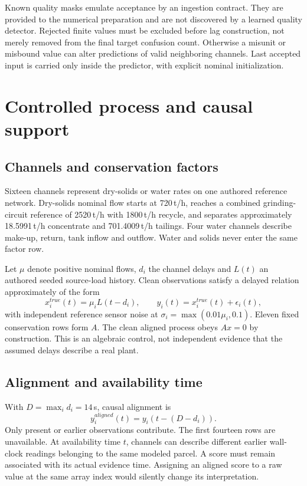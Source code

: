 \documentclass[11pt,a4paper]{article}
\begin{document}
Known quality masks emulate acceptance by an ingestion contract. They are provided to the numerical preparation and are not discovered by a learned quality detector. Rejected finite values must be excluded before lag construction, not merely removed from the final target confusion count. Otherwise a misunit or misbound value can alter predictions of valid neighboring channels. Last accepted input is carried only inside the predictor, with explicit nominal initialization.

\section{Controlled process and causal support}
\subsection{Channels and conservation factors}
Sixteen channels represent dry-solids or water rates on one authored reference network. Dry-solids nominal flow starts at 720\,t/h, reaches a combined grinding-circuit reference of 2520\,t/h with 1800\,t/h recycle, and separates approximately 18.5991\,t/h concentrate and 701.4009\,t/h tailings. Four water channels describe make-up, return, tank inflow and outflow. Water and solids never enter the same factor row.

Let $\mu$ denote positive nominal flows, $d_i$ the channel delays and $L(t)$ an authored seeded source-load history. Clean observations satisfy a delayed relation approximately of the form
\begin{equation}
 x_i^{true}(t)=\mu_i L(t-d_i),\qquad
 y_i(t)=x_i^{true}(t)+\epsilon_i(t),
\end{equation}
with independent reference sensor noise at $\sigma_i=\max(0.01\mu_i,0.1)$. Eleven fixed conservation rows form $A$. The clean aligned process obeys $Ax=0$ by construction. This is an algebraic control, not independent evidence that the assumed delays describe a real plant.

\subsection{Alignment and availability time}
With $D=\max_i d_i=14$\,s, causal alignment is
\begin{equation}
 y_i^{aligned}(t)=y_i(t-(D-d_i)).
\end{equation}
Only present or earlier observations contribute. The first fourteen rows are unavailable. At availability time $t$, channels can describe different earlier wall-clock readings belonging to the same modeled parcel. A score must remain associated with its actual evidence time. Assigning an aligned score to a raw value at the same array index would silently change its interpretation.
\end{document}
